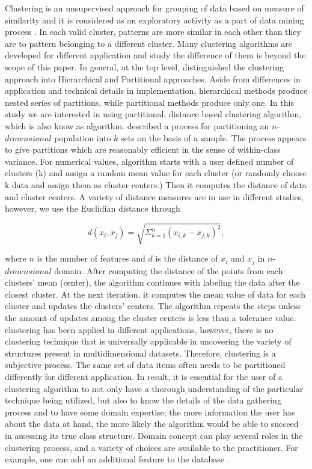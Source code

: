 
Clustering is an unsupervised approach for grouping of data based on measure of similarity and it is considered as an exploratory activity as a part of data mining process \citep{Fayyad_1996_IEEE}. In each valid cluster, patterns are more similar in each other than they are to pattern belonging to a different cluster. Many clustering algorithms are developed for different application and study the difference of them is beyond the scope of this paper. In general, at the top level,  \citet{Jain_1999} distinguished the clustering approach into Hierarchical and Partitional approaches. Aside from differences in application and technical details in implementation, hierarchical methods produce nested series of partitions, while partitional methods produce only one. In this study we are interested in using partitional, distance based clustering algorithm, which is also know as \kmeans{} algorithm.  \citet{Macqueen_1967_Proc}  described a process for partitioning an $n$-$dimensional$ population into $k$ sets on the basis of a sample. The process appears to give partitions which are reasonably efficient in the sense of within-class variance. For numerical values, \kmeans{} algorithm starts with a user defined number of clusters (k) and assign a random mean value for each cluster (or randomly choose k data and assign them as cluster centers.) Then it computes the distance of data and cluster centers. A variety of distance measures are in use in different studies, however, we use the Euclidian distance through 

\begin{equation}
d(x_i,x_j)=\sqrt{\Sigma_{k=1}^{n}(x_{i,k} - x_{j,k})^2},
\end{equation}

where $n$ is the number of features and $d$ is the distance of $x_i$ and $x_j$ in $n$-$dimensional$ domain. After computing the distance of the points from each clusters' mean (center), the algorithm continues with labeling the data after the closest cluster. At the next iteration, it computes the mean value of data for each cluster and updates the clusters' centers. The algorithm repeats the steps unless the amount of updates among the cluster centers is less than a tolerance value.  \kmeans{} clustering has been applied in different applications, however, there is no clustering technique that is universally applicable in uncovering the variety of structures present in multidimensional datasets. Therefore, clustering is a subjective process. The same set of data items often needs to be partitioned differently for different application. In result, it is essential for the user of a clustering algorithm to not only have a thorough understanding of the particular technique being utilized, but also to know the details of the data gathering process and to have some domain expertise; the more information the user has about the data at hand, the more likely the algorithm would be able to succeed in assessing its true class structure. Domain concept can play several roles in the clustering process, and a variety of choices are available to the practitioner. For example, one can add an additional feature to the database \citep{Jain_1999}. 


